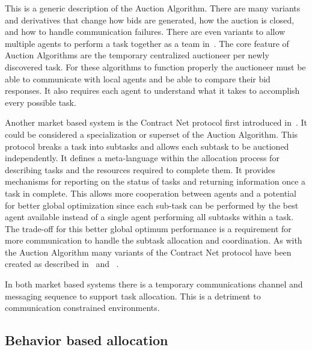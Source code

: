 This is a generic description of the Auction Algorithm.  There are many variants and derivatives that change how bids are generated, how the auction is closed, and how to handle communication failures.  There are even variants to allow multiple agents to perform a task together as a team in~\citet{auction_team}.  The core feature of Auction Algorithms are the temporary centralized auctioneer per newly discovered task.  For these algorithms to function properly the auctioneer must be able to communicate with local agents and be able to compare their bid responses.  It also requires each agent to understand what it takes to accomplish every possible task.

Another market based system is the Contract Net protocol first introduced in~\citet{contract_net}.  It could be considered a specialization or superset of the Auction Algorithm.  This protocol breaks a task into subtasks and allows each subtask to be auctioned independently. It defines a meta-language within the allocation process for describing tasks and the resources required to complete them.  It provides mechanisms for reporting on the status of tasks and returning information once a task in complete.  This allows more cooperation between agents and a potential for better global optimization since each sub-task can be performed by the best agent available instead of a single agent performing all subtasks within a task.  The trade-off for this better global optimum performance is a requirement for more communication to handle the subtask allocation and coordination.  As with the Auction Algorithm many variants of the Contract Net protocol have been created as described in~\citet{contract_survey} and ~\citet{contract_equity}.

In both market based systems there is a temporary communications channel and messaging sequence to support task allocation.  This is a detriment to communication constrained environments.

\subsection{Behavior based allocation}

